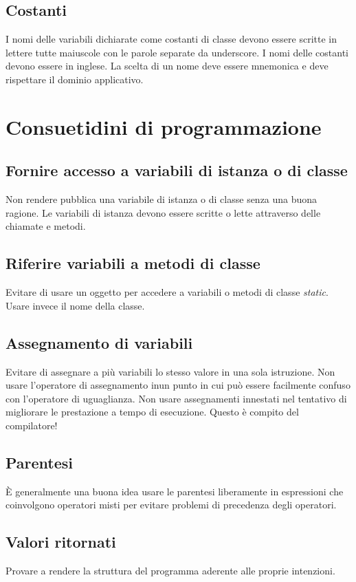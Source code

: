 \subsection{Costanti}
I nomi delle variabili dichiarate come costanti di classe devono essere scritte in lettere tutte maiuscole con le parole separate da underscore. I nomi delle costanti devono essere in inglese. La scelta di un nome deve essere mnemonica e deve rispettare il dominio applicativo.
\clearpage
%
%
\section{Consuetidini di programmazione}
\subsection{Fornire accesso a variabili di istanza o di classe}
Non rendere pubblica una variabile di istanza o di classe senza una buona ragione. Le variabili di istanza devono essere scritte o lette attraverso delle chiamate e metodi.
\subsection{Riferire variabili a metodi di classe}
Evitare di usare un oggetto per accedere a variabili o metodi di classe \textit{static}. Usare invece il nome della classe.
\subsection{Assegnamento di variabili}
Evitare di assegnare a più variabili lo stesso valore in una sola istruzione. Non usare l'operatore di assegnamento inun punto in cui può essere facilmente confuso con l'operatore di uguaglianza. Non usare assegnamenti innestati nel tentativo di migliorare le prestazione a tempo di esecuzione. Questo è compito del compilatore!
\subsection{Parentesi}
È generalmente una buona idea usare le parentesi liberamente in espressioni che coinvolgono operatori misti per evitare problemi di precedenza degli operatori.
\subsection{Valori ritornati}
Provare a rendere la struttura del programma aderente alle proprie intenzioni.
